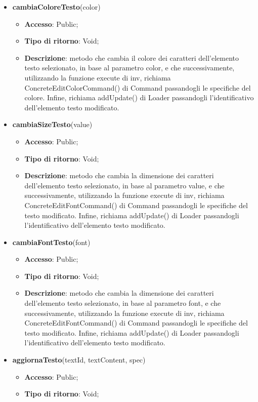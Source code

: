 {{\begin{itemize}
			\item \textbf{cambiaColoreTesto}(color)
			\begin{itemize}
				\item \textbf{Accesso}: Public;
				\item \textbf{Tipo di ritorno}: Void;
				\item \textbf{Descrizione}: metodo che cambia il colore dei caratteri dell'elemento testo selezionato, in base al parametro color, e che successivamente, utilizzando la funzione execute di inv, richiama ConcreteEditColorCommand() di Command passandogli le specifiche del colore. Infine, richiama addUpdate() di Loader passandogli l'identificativo dell'elemento testo modificato.
			\end{itemize}
			\item \textbf{cambiaSizeTesto}(value)
			\begin{itemize}
				\item \textbf{Accesso}: Public;
				\item \textbf{Tipo di ritorno}: Void;
				\item \textbf{Descrizione}: metodo che cambia la dimensione dei caratteri dell'elemento testo selezionato, in base al parametro value, e che successivamente, utilizzando la funzione execute di inv, richiama ConcreteEditFontCommand() di Command passandogli le specifiche del testo modificato. Infine, richiama addUpdate() di Loader passandogli l'identificativo dell'elemento testo modificato.
			\end{itemize}
			\item \textbf{cambiaFontTesto}(font)
			\begin{itemize}
				\item \textbf{Accesso}: Public;
				\item \textbf{Tipo di ritorno}: Void;
				\item \textbf{Descrizione}: metodo che cambia la dimensione dei caratteri dell'elemento testo selezionato, in base al parametro font, e che successivamente, utilizzando la funzione execute di inv, richiama ConcreteEditFontCommand() di Command passandogli le specifiche del testo modificato. Infine, richiama addUpdate() di Loader passandogli l'identificativo dell'elemento testo modificato.
			\end{itemize}
			\item \textbf{aggiornaTesto}(textId, textContent, spec)
			\begin{itemize}
				\item \textbf{Accesso}: Public;
				\item \textbf{Tipo di ritorno}: Void;

\end{itemize}
\end{itemize}}}
